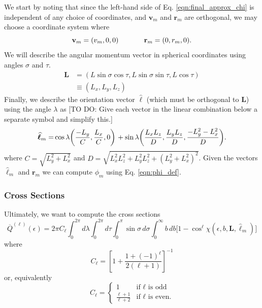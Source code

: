 \documentclass[article]{revtex4-2}
\begin{document}
We start by noting that since the left-hand side of Eq. \ref{eqn:final_approx_chi} is independent of any choice of coordinates, and $\mathbf{v}_m$ and $\mathbf{r}_m$ are orthogonal, we may choose a coordinate system where
\begin{equation}
    \mathbf{v}_m = (v_m,0,0)\hspace{0.5in}\mathbf{r}_m = (0,r_m,0).
\end{equation}
We will describe the angular momentum vector in spherical coordinates using angles $\sigma$ and $\tau$.
\begin{align}
    \mathbf{L} &= (L\sin \sigma \cos \tau, L\sin \sigma \sin \tau, L\cos \tau) \nonumber \\
    &\equiv (L_x, L_y, L_z)
\end{align}
Finally, we describe the orientation vector $\widehat{\boldsymbol{\ell}}$ (which must be orthogonal to $\mathbf{L}$) using the angle $\lambda$ as [TO DO: Give each vector in the linear combination below a separate symbol and simplify this.]
\begin{equation}
    \widehat{\boldsymbol{\ell}}_m = \mkern-2mu \cos \lambda \bigg( \frac{-L_y}{C}, \frac{L_x}{C},0
    \bigg) \mkern2mu + \mkern2mu \mkern-2mu \sin \lambda \bigg(
    \frac{L_xL_z}{D},
    \frac{L_yL_z}{D},
    \frac{-L_y^2-L_x^2}{D}
    \bigg).
    \label{eqn:w_m_in_coords}
\end{equation}
where $C = \sqrt{L_y^2+L_x^2}$ and $D = \sqrt{L_x^2L_z^2+L_y^2L_z^2+(L_y^2+L_x^2)^2}$. Given the vectors $\widehat{\boldsymbol{\ell}}_m$ and $\mathbf{r}_m$ we can compute $\phi_m$ using Eq. \ref{eqn:phi_def}. 

\subsubsection{Cross Sections} Ultimately, we want to compute the cross sections
\begin{equation}
    \overline{Q}^{(\ell)}(\epsilon) = 2\pi C_\ell  \int_{0}^{2\pi} \!d\lambda \int_{0}^{2\pi} \!d\tau \int_{0}^\pi \sin \sigma \, d\sigma \int_{0}^\infty b\, db \big[1 - \cos^{\ell}\chi(\epsilon, b, \mathbf{L}, \widehat{\boldsymbol{\ell}}_m)\big]
    \label{eqn:cross_section_integral}
\end{equation}
where
\begin{equation}
    C_\ell = \left[ 1 + \frac{1 + (-1)^\ell}{2 (\ell + 1)} \right]^{-1} 
\end{equation}
or, equivalently
\begin{equation}
    C_\ell = \begin{cases}
1 & \text{if } \ell \mbox{ is odd} \\ \frac{\ell + 1}{\ell + 2} & \text{if } \ell \mbox{ is even.}
\end{cases}
\end{equation}
\end{document}
